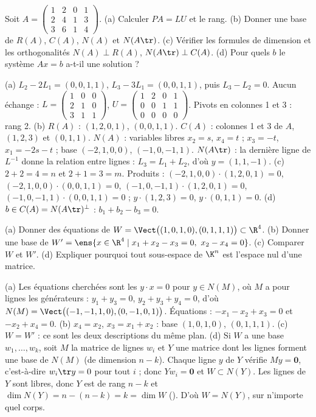 \begin{exo}
Soit $A=\begin{pmatrix}1&2&0&1\\2&4&1&3\\3&6&1&4\end{pmatrix}$.
(a) Calculer $PA=LU$ et le rang. (b) Donner une base de $R(A)$, $C(A)$, $N(A)$ et $N(A\tr)$. (c) Vérifier les formules de dimension et les orthogonalités $N(A)\perp R(A)$, $N(A\tr)\perp C(A)$. (d) Pour quels $b$ le système $Ax=b$ a-t-il une solution ?
\begin{corrige}
(a) $L_2-2L_1=(0,0,1,1)$, $L_3-3L_1=(0,0,1,1)$, puis $L_3-L_2=0$. Aucun échange : $L=\begin{pmatrix}1&0&0\\2&1&0\\3&1&1\end{pmatrix}$, $U=\begin{pmatrix}1&2&0&1\\0&0&1&1\\0&0&0&0\end{pmatrix}$. Pivots en colonnes 1 et 3 : rang 2.
(b) $R(A)$ : $(1,2,0,1)$, $(0,0,1,1)$. $C(A)$ : colonnes 1 et 3 de $A$, $(1,2,3)$ et $(0,1,1)$. $N(A)$ : variables libres $x_2=s$, $x_4=t$ ; $x_3=-t$, $x_1=-2s-t$ ; base $(-2,1,0,0)$, $(-1,0,-1,1)$. $N(A\tr)$ : la dernière ligne de $L^{-1}$ donne la relation entre lignes : $L_3=L_1+L_2$, d'où $y=(1,1,-1)$.
(c) $2+2=4=n$ et $2+1=3=m$. Produits : $(-2,1,0,0)\cdot(1,2,0,1)=0$, $(-2,1,0,0)\cdot(0,0,1,1)=0$, $(-1,0,-1,1)\cdot(1,2,0,1)=0$, $(-1,0,-1,1)\cdot(0,0,1,1)=0$ ; $y\cdot(1,2,3)=0$, $y\cdot(0,1,1)=0$.
(d) $b\in C(A)=N(A\tr)^\perp$ : $b_1+b_2-b_3=0$.
\end{corrige}
\end{exo}
\begin{exo}\label{exo-deux-descriptions}
(a) Donner des équations de $W=\Vect\big((1,0,1,0),(0,1,1,1)\big)\subset\R^4$. (b) Donner une base de $W'=\ens{x\in\R^4\mid x_1+x_2-x_3=0,\ x_2-x_4=0}$. (c) Comparer $W$ et $W'$. (d) Expliquer pourquoi tout sous-espace de $\K^n$ est l'espace nul d'une matrice.
\begin{corrige}
(a) Les équations cherchées sont les $y\cdot x=0$ pour $y\in N(M)$, où $M$ a pour lignes les générateurs : $y_1+y_3=0$, $y_2+y_3+y_4=0$, d'où $N(M)=\Vect\big((-1,-1,1,0),(0,-1,0,1)\big)$. Équations : $-x_1-x_2+x_3=0$ et $-x_2+x_4=0$.
(b) $x_4=x_2$, $x_3=x_1+x_2$ : base $(1,0,1,0)$, $(0,1,1,1)$.
(c) $W=W'$ : ce sont les deux descriptions du même plan.
(d) Si $W$ a une base $w_1,\dots,w_k$, soit $M$ la matrice de lignes $w_i$ et $Y$ une matrice dont les lignes forment une base de $N(M)$ (de dimension $n-k$). Chaque ligne $y$ de $Y$ vérifie $My=\mathbf 0$, c'est-à-dire $w_i\tr y=0$ pour tout $i$ ; donc $Yw_i=\mathbf 0$ et $W\subset N(Y)$. Les lignes de $Y$ sont libres, donc $Y$ est de rang $n-k$ et $\dim N(Y)=n-(n-k)=k=\dim W$ (). D'où $W=N(Y)$, sur n'importe quel corps.
\end{corrige}
\end{exo}
